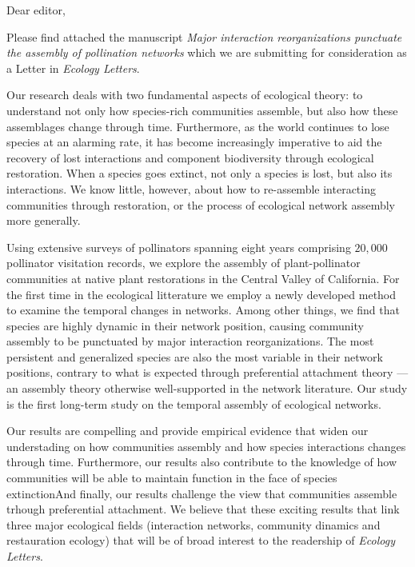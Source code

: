 \documentclass[12pt]{letter}
\begin{document}
\begin{letter}{}

  \opening{Dear editor,}

  Please find attached the manuscript \textit{Major interaction%
    reorganizations punctuate the assembly of pollination networks}
  which we are submitting for consideration as a Letter in
  \textit{Ecology Letters}.  

Our research deals with two fundamental aspects of ecological theory: to understand not only how species-rich communities assemble, but also how these assemblages change through time. Furthermore, as the
  world continues to lose species at an alarming rate, it has become
  increasingly imperative to aid the recovery of lost interactions and
  component biodiversity through ecological restoration. When a species goes extinct, not only a species is lost, but also its interactions. We know little, however, about how to re-assemble interacting communities
  through restoration, or the process of ecological network assembly
  more generally. 

  Using extensive surveys of pollinators spanning eight years
  comprising \texttildelow $20,000$ pollinator visitation records, we
  explore the assembly of plant-pollinator communities at native plant
  restorations in the Central Valley of California. For the first time in the ecological litterature we employ a newly
  developed method to examine the temporal changes in networks. Among other things, we
  find that species are highly dynamic in their network position,
  causing community assembly to be punctuated by major interaction
  reorganizations. The most persistent and generalized species are
  also the most variable in their network positions, contrary to what
  is expected through preferential attachment theory --- an assembly
  theory otherwise well-supported in the network literature. Our study
  is the first long-term study on the temporal assembly of ecological
  networks.

Our results are compelling and provide empirical evidence that widen our understading on how communities assembly and how species interactions changes through time. Furthermore, our results also contribute to the knowledge of how communities will be able to maintain function in the face of species extinctionAnd finally, our results challenge the view that communities assemble trhough preferential attachment. We believe that these exciting results that link three major ecological fields (interaction networks, community dinamics and restauration ecology) that will be of broad interest to the readership of \textit{Ecology Letters}. 


\end{letter}
\end{document}
